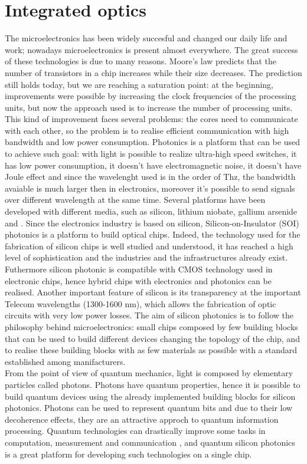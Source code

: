 \section{Integrated optics}
The microelectronics has been widely succesful and changed our daily life and work; nowadays microelectronics is present almost everywhere. The great success of these technologies is due to many reasons. Moore's law predicts that the number of transistors in a chip increases while their size decreases. The prediction still holds today, but we are reaching a saturation point: at the beginning, improvements were possible by increasing the clock frequencies of the processing units, but now the approach used is to increase the number of processing units. This kind of improvement faces several problems: the cores need to communicate with each other, so the problem is to realise efficient communication with high bandwidth and low power consumption. Photonics is a platform that can be used to achieve such goal: with light is possible to realize ultra-high speed switches, it has low power consumption, it doesn't have electromagnetic noise, it doesn't have Joule effect and since the wavelenght used is in the order of Thz, the bandwidth avaiable is much larger then in electronics, moreover it's possible to send signals over different wavelength at the same time. Several platforms have been developed with different media, such as silicon, lithium niobate, gallium arsenide and . Since the electronics industry is based on silicon, Silicon-on-Insulator (SOI) photonics is a platform to build optical chips. Indeed, the technology used for the fabrication of silicon chips is well studied and understood, it has reached a high level of sophistication and the industries and the infrastructures already exist. Futhermore silicon photonic is compatible with CMOS technology used in electronic chips, hence hybrid chips with electronics and photonics can be realised. Another important feature of silicon is its transparency at the important Telecom wavelengths (1300-1600 nm), which allows the fabrication of optic circuits with very low power losses. The aim of silicon photonics is to follow the philosophy behind microelectronics: small chips composed by few building blocks that can be used to build different devices changing the topology of the chip, and to realise these building blocks with as few materials as possible with a standard established among manifacturers.\\
From the point of view of quantum mechanics, light is composed by elementary particles called photons. Photons have quantum properties, hence it is possible to build quantum devices using the already implemented building blocks for silicon photonics. Photons can be used to represent quantum bits and due to their low decoherence effects, they are an attractive approch to quantum information processing. Quantum technologies can drastically improve some tasks in computation, measurement and communication , and quantum silicon photonics is a great platform for developing such technologies on a single chip. 


